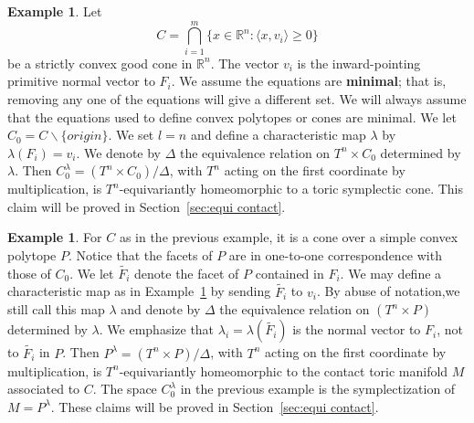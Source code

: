 \documentclass[12pt]{amsart}
\def\R {{\mathbb{R}}}
\theoremstyle{definition}
\newtheorem{example}[theorem]{Example}
\numberwithin{equation}{section}
\begin{document}
\begin{example}\label{ex:symplectic cone combina}
  Let
  \begin{equation}
  C= \bigcap_{i=1}^{m}\{x\in \R^n: \langle x, v_{i}\rangle \geq 0\}
\end{equation}
be a strictly convex good cone in $\R^n$. The vector $v_{i}$ is the
inward-pointing primitive normal vector to $F_{i}$. We assume the
equations are {\bf minimal}; that is, removing any one of the
equations will give a different set. We will always assume that the
equations used to define convex polytopes or cones are minimal. We
let $C_{0}=C\backslash
 \{origin\}$. We set $l=n$ and define a characteristic map $\lambda$ by $\lambda(F_{i})=v_{i}$.
 We denote by $\Delta$ the equivalence relation on $T^n\times C_{0}$ determined
 by $\lambda$.
 Then $C_{0}^{\lambda}= (T^n\times C_{0})/\Delta$, with $T^n$ acting on the first coordinate by multiplication, is
$T^n$-equivariantly homeomorphic to a toric symplectic cone. This
claim will be proved in Section~\ref{sec:equi contact}.
\end{example}

\begin{example}\label{ex:contact combina}
 For $C$ as in the previous example, it is a cone over a simple convex polytope $P$.
Notice that the facets of $P$ are in one-to-one correspondence with
those of $C_{0}$. We let $\tilde{F_{i}}$ denote the facet of $P$
contained in $F_{i}$. We may define a characteristic map as in
Example~\ref{ex:symplectic cone combina} by sending $\tilde{F_{i}}$
to $v_{i}$. By abuse of notation,we still call this map $\lambda$
and denote by $\Delta$ the equivalence relation on $(T^n\times P)$
determined by $\lambda$. We emphasize that $\lambda_{i}=
\lambda(\tilde{F_{i}})$ is the normal vector to $F_{i}$, not to
$\tilde{F_{i}}$ in $P$.  Then $P^{\lambda}= (T^n\times P)/\Delta$,
with $T^n$ acting on the first coordinate by multiplication, is
$T^n$-equivariantly homeomorphic to the contact toric manifold $M$
associated to $C$. The space $C_{0}^{\lambda}$ in the previous
example is the symplectization of $M=P^{\lambda}$. These claims will
be proved in Section~\ref{sec:equi contact}.
\end{example}
\end{document}
